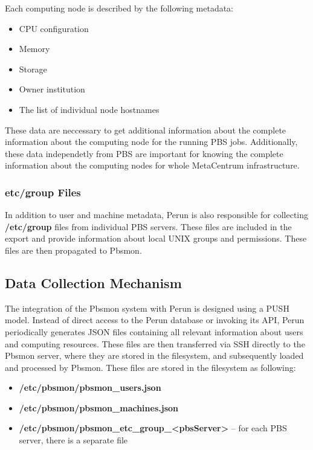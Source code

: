 \documentclass[
  digital,     %
  oneside,     %
  nosansbold,  %
  nocolorbold, %
  lof,         %
  lot,         %
]{fithesis4}
\begin{document}
Each computing node is described by the following metadata:

\begin{itemize}
  \item CPU configuration
  \item Memory
  \item Storage
  \item Owner institution
  \item The list of individual node hostnames
\end{itemize}

These data are neccessary to get additional information about the complete information about the computing node for the running PBS jobs.
Additionally, these data independetly from PBS are important for knowing the complete information about the computing nodes for whole MetaCentrum infrastructure.

\subsubsection{etc/group Files}
\label{subsubsec:groups-perun}
In addition to user and machine metadata, Perun is also responsible for collecting \textbf{/etc/group} files from individual PBS servers. These files are included in the export and provide information about local UNIX groups and permissions. These files are then propagated to Pbsmon.


\subsection{Data Collection Mechanism}
\label{subsec:data-collection-mechanism-perun}

The integration of the Pbsmon system with Perun is designed using a PUSH model. Instead of direct access to the Perun database or invoking its API, Perun periodically generates JSON files containing all relevant information about users and computing resources. These files are then transferred via SSH directly to the Pbsmon server, where they are stored in the filesystem, and subsequently loaded and processed by Pbsmon. These files are stored in the filesystem as following:

\begin{itemize}
  \item \textbf{/etc/pbsmon/pbsmon\_users.json} 
  \item \textbf{/etc/pbsmon/pbsmon\_machines.json}
  \item \textbf{/etc/pbsmon/pbsmon\_etc\_group\_<pbsServer>} -- 
  for each PBS server, there is a separate file
\end{itemize}
\end{document}
